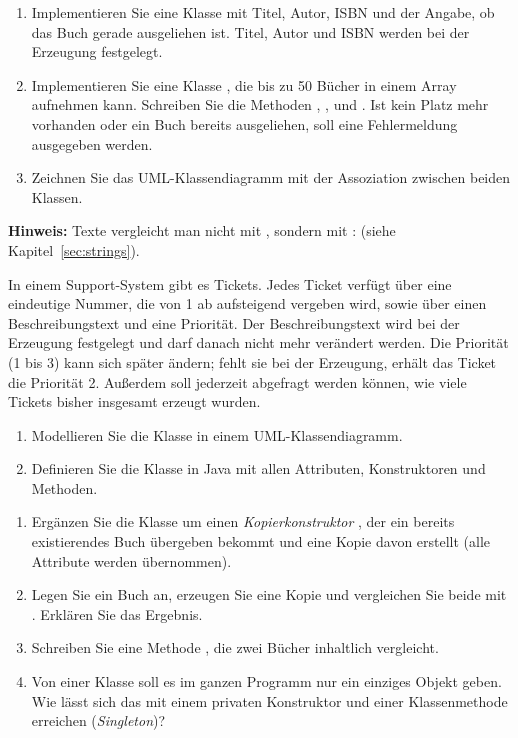 \begin{enumerate}[label=\alph*)]
\item Implementieren Sie eine Klasse  mit Titel, Autor, ISBN und der Angabe, ob das Buch gerade ausgeliehen ist. Titel, Autor und ISBN werden bei der Erzeugung festgelegt.
\item Implementieren Sie eine Klasse , die bis zu 50 Bücher in einem Array aufnehmen kann. Schreiben Sie die Methoden , ,  und . Ist kein Platz mehr vorhanden oder ein Buch bereits ausgeliehen, soll eine Fehlermeldung ausgegeben werden.
\item Zeichnen Sie das UML-Klassendiagramm mit der Assoziation zwischen beiden Klassen.
\end{enumerate}
\begin{hinweis}
\textbf{Hinweis:} Texte vergleicht man nicht mit \code{==}, sondern mit :  (siehe Kapitel~\ref{sec:strings}).
\end{hinweis}

In einem Support-System gibt es Tickets. Jedes Ticket verfügt über eine eindeutige Nummer, die von 1 ab aufsteigend vergeben wird, sowie über einen Beschreibungstext und eine Priorität. Der Beschreibungstext wird bei der Erzeugung festgelegt und darf danach nicht mehr verändert werden. Die Priorität (1 bis 3) kann sich später ändern; fehlt sie bei der Erzeugung, erhält das Ticket die Priorität 2. Außerdem soll jederzeit abgefragt werden können, wie viele Tickets bisher insgesamt erzeugt wurden.
\begin{enumerate}[label=\alph*)]
\item Modellieren Sie die Klasse in einem UML-Klassendiagramm.
\item Definieren Sie die Klasse in Java mit allen Attributen, Konstruktoren und Methoden.
\end{enumerate}

\begin{enumerate}[label=\alph*)]
\item Ergänzen Sie die Klasse  um einen \emph{Kopierkonstruktor} , der ein bereits existierendes Buch übergeben bekommt und eine Kopie davon erstellt (alle Attribute werden übernommen).
\item Legen Sie ein Buch an, erzeugen Sie eine Kopie und vergleichen Sie beide mit \code{==}. Erklären Sie das Ergebnis.
\item Schreiben Sie eine Methode , die zwei Bücher inhaltlich vergleicht.
\item Von einer Klasse  soll es im ganzen Programm nur ein einziges Objekt geben. Wie lässt sich das mit einem privaten Konstruktor und einer Klassenmethode  erreichen (\emph{Singleton})?
\end{enumerate}

